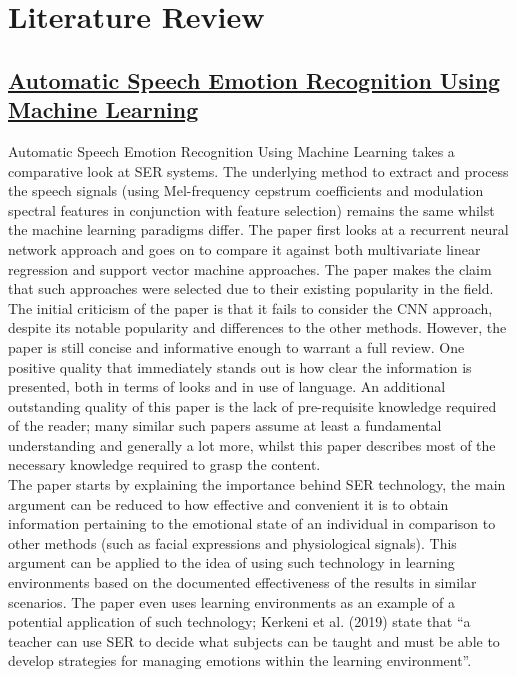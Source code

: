 \documentclass[12pt]{article}
\begin{document}
\section{Literature Review}

\subsection{\href{https://www.intechopen.com/books/social-media-and-machine-learning/automatic-speech-emotion-recognition-using-machine-learning}{Automatic Speech Emotion Recognition Using Machine Learning}}
Automatic Speech Emotion Recognition Using Machine Learning takes a comparative look at SER systems. The underlying method to extract and process the speech signals (using Mel-frequency cepstrum coefficients and modulation spectral features in conjunction with feature selection) remains the same whilst the machine learning paradigms differ. The paper first looks at a recurrent neural network approach and goes on to compare it against both multivariate linear regression and support vector machine approaches. The paper makes the claim that such approaches were selected due to their existing popularity in the field. 
\\

\noindent The initial criticism of the paper is that it fails to consider the CNN approach, despite its notable popularity and differences to the other methods. However, the paper is still concise and informative enough to warrant a full review. One positive quality that immediately stands out is how clear the information is presented, both in terms of looks and in use of language. An additional outstanding quality of this paper is the lack of pre-requisite knowledge required of the reader; many similar such papers assume at least a fundamental understanding and generally a lot more, whilst this paper describes most of the necessary knowledge required to grasp the content.
\\

\noindent The paper starts by explaining the importance behind SER technology, the main argument can be reduced to how effective and convenient it is to obtain information pertaining to the emotional state of an individual in comparison to other methods (such as facial expressions and physiological signals). This argument can be applied to the idea of using such technology in learning environments based on the documented effectiveness of the results in similar scenarios. The paper even uses learning environments as an example of a potential application of such technology; Kerkeni et al. (2019) state that ``a teacher can use SER to decide what subjects can be taught and must be able to develop strategies for managing emotions within the learning environment''.
\\
\end{document}
